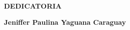 \newpage
\vspace*{\fill}
\begin{flushright}
  \footnotesize
	\begin{minipage}{0.5\textwidth}
		\begin{flushright}
			\uppercase{\textbf{Dedicatoria}}
		\end{flushright}
		\itshape

		\bigbreak
		\begin{flushright}
			\textbf{Jeniffer Paulina Yaguana Caraguay}
		\end{flushright}
	\end{minipage}
\end{flushright}
\vspace*{\fill}
